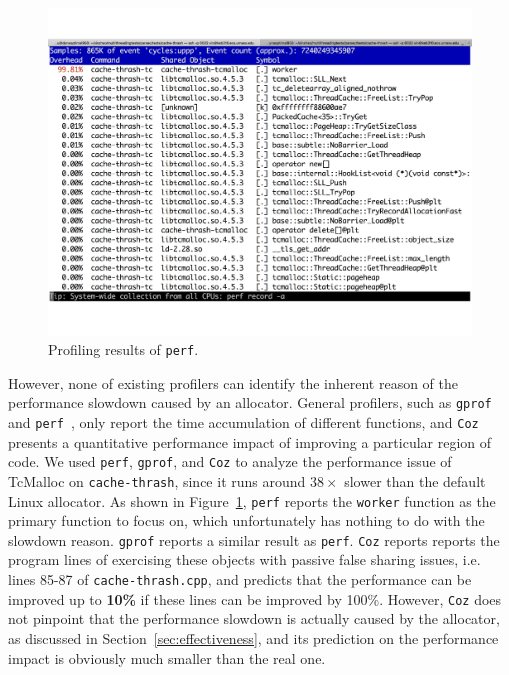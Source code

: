\begin{figure}[!ht]
\centering
\includegraphics[width=0.9\columnwidth]{figures/perf-cache-thrash-tcmalloc}
\caption{Profiling results of \texttt{perf}. \label{fig:mot1}}
\end{figure}

However, none of existing profilers can identify the inherent reason of the performance slowdown caused by an allocator. General profilers, such as \texttt{gprof}~\cite{DBLP:conf/sigplan/GrahamKM82} and \texttt{perf}~\cite{perf}, only report the time accumulation of different functions, and \texttt{Coz}~\cite{Coz} presents a quantitative performance impact of improving a particular region of code. We used \texttt{perf}, \texttt{gprof}, and \texttt{Coz} to analyze the performance issue of TcMalloc on \texttt{cache-thrash}, since it runs around $38\times$ slower than the default Linux allocator. As shown in Figure~\ref{fig:mot1}, \texttt{perf} reports the \texttt{worker} function as the primary function to focus on, which unfortunately has nothing to do with the slowdown reason. \texttt{gprof} reports a similar result as \texttt{perf}. \texttt{Coz} reports reports the program lines of exercising these objects with passive false sharing issues, i.e. lines 85-87 of \texttt{cache-thrash.cpp}, and predicts that the performance can be improved up to \textbf{10\%} if these lines can be improved by 100\%. However, \texttt{Coz} does not pinpoint that the performance slowdown is actually caused by the allocator, as discussed in Section~\ref{sec:effectiveness}, and its prediction on the performance impact is obviously much smaller than the real one.

